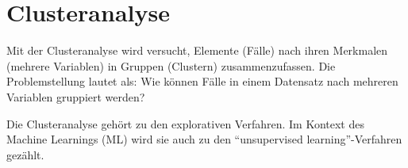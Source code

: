 \documentclass[
  10pt,
  letterpaper,
  a4paper, twoside]{scrreprt}
\newenvironment{Shaded}{\begin{snugshade}}{\end{snugshade}}
\newcommand{\AttributeTok}[1]{\textcolor[rgb]{0.40,0.45,0.13}{#1}}
\newcommand{\CommentTok}[1]{\textcolor[rgb]{0.37,0.37,0.37}{#1}}
\newcommand{\ConstantTok}[1]{\textcolor[rgb]{0.56,0.35,0.01}{#1}}
\newcommand{\DecValTok}[1]{\textcolor[rgb]{0.68,0.00,0.00}{#1}}
\newcommand{\FloatTok}[1]{\textcolor[rgb]{0.68,0.00,0.00}{#1}}
\newcommand{\FunctionTok}[1]{\textcolor[rgb]{0.28,0.35,0.67}{#1}}
\newcommand{\NormalTok}[1]{\textcolor[rgb]{0.00,0.23,0.31}{#1}}
\newcommand{\OtherTok}[1]{\textcolor[rgb]{0.00,0.23,0.31}{#1}}
\newcommand{\SpecialCharTok}[1]{\textcolor[rgb]{0.37,0.37,0.37}{#1}}
\newcommand{\StringTok}[1]{\textcolor[rgb]{0.13,0.47,0.30}{#1}}
\begin{document}
\begin{Shaded}
\end{Shaded}


\chapter{Clusteranalyse}\label{clusteranalyse}

\hfill\break

Mit der Clusteranalyse wird versucht, Elemente (Fälle) nach ihren
Merkmalen (mehrere Variablen) in Gruppen (Clustern) zusammenzufassen.
Die Problemstellung lautet als: Wie können Fälle in einem Datensatz nach
mehreren Variablen gruppiert werden?

Die Clusteranalyse gehört zu den explorativen Verfahren. Im Kontext des
Machine Learnings (ML) wird sie auch zu den \enquote{unsupervised
learning}-Verfahren gezählt.
\end{document}
